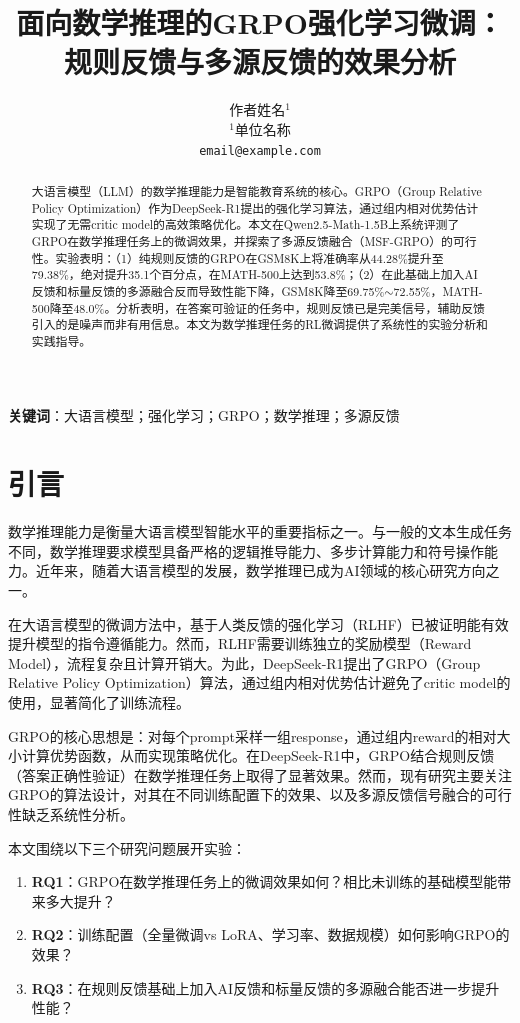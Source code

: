 \documentclass[10.5pt]{article}
\title{\textbf{面向数学推理的GRPO强化学习微调：规则反馈与多源反馈的效果分析}}
\author{
  作者姓名$^{1}$ \\
  $^{1}$单位名称 \\
  \texttt{email@example.com}
}
\date{}
\begin{document}
\maketitle

\begin{abstract}
大语言模型（LLM）的数学推理能力是智能教育系统的核心。GRPO（Group Relative Policy Optimization）作为DeepSeek-R1提出的强化学习算法，通过组内相对优势估计实现了无需critic model的高效策略优化。本文在Qwen2.5-Math-1.5B上系统评测了GRPO在数学推理任务上的微调效果，并探索了多源反馈融合（MSF-GRPO）的可行性。实验表明：（1）纯规则反馈的GRPO在GSM8K上将准确率从44.28\%提升至79.38\%，绝对提升35.1个百分点，在MATH-500上达到53.8\%；（2）在此基础上加入AI反馈和标量反馈的多源融合反而导致性能下降，GSM8K降至69.75\%$\sim$72.55\%，MATH-500降至48.0\%。分析表明，在答案可验证的任务中，规则反馈已是完美信号，辅助反馈引入的是噪声而非有用信息。本文为数学推理任务的RL微调提供了系统性的实验分析和实践指导。
\end{abstract}

\textbf{关键词}：大语言模型；强化学习；GRPO；数学推理；多源反馈

\section{引言}

数学推理能力是衡量大语言模型智能水平的重要指标之一。与一般的文本生成任务不同，数学推理要求模型具备严格的逻辑推导能力、多步计算能力和符号操作能力\cite{qwen25math}。近年来，随着大语言模型的发展，数学推理已成为AI领域的核心研究方向之一。

在大语言模型的微调方法中，基于人类反馈的强化学习（RLHF）\cite{instructgpt}已被证明能有效提升模型的指令遵循能力。然而，RLHF需要训练独立的奖励模型（Reward Model），流程复杂且计算开销大。为此，DeepSeek-R1\cite{deepseekr1}提出了GRPO（Group Relative Policy Optimization）算法，通过组内相对优势估计避免了critic model的使用，显著简化了训练流程。

GRPO的核心思想是：对每个prompt采样一组response，通过组内reward的相对大小计算优势函数，从而实现策略优化。在DeepSeek-R1中，GRPO结合规则反馈（答案正确性验证）在数学推理任务上取得了显著效果。然而，现有研究主要关注GRPO的算法设计，对其在不同训练配置下的效果、以及多源反馈信号融合的可行性缺乏系统性分析。

本文围绕以下三个研究问题展开实验：

\begin{enumerate}[leftmargin=2em]
  \item \textbf{RQ1}：GRPO在数学推理任务上的微调效果如何？相比未训练的基础模型能带来多大提升？
  \item \textbf{RQ2}：训练配置（全量微调vs LoRA、学习率、数据规模）如何影响GRPO的效果？
  \item \textbf{RQ3}：在规则反馈基础上加入AI反馈和标量反馈的多源融合能否进一步提升性能？
\end{enumerate}
\end{document}
